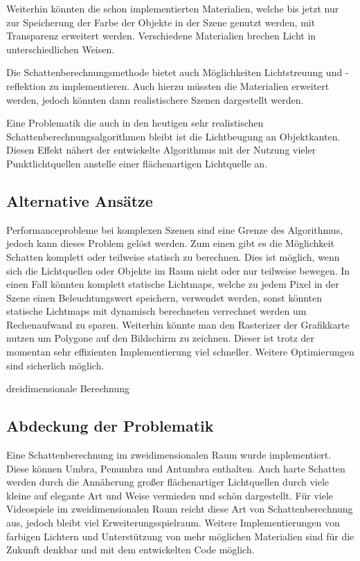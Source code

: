 Weiterhin könnten die schon implementierten Materialien, welche bis jetzt nur zur Speicherung der
Farbe der Objekte in der Szene genutzt werden, mit Transparenz erweitert werden. Verschiedene
Materialien brechen Licht in unterschiedlichen Weisen.

Die Schattenberechnungsmethode bietet auch Möglichkeiten Lichtstreuung und -reflektion zu
implementieren. Auch hierzu müssten die Materialien erweitert werden, jedoch könnten dann
realistischere Szenen dargestellt werden.

Eine Problematik die auch in den heutigen sehr realistischen Schattenberechnungsalgorithmen bleibt
ist die Lichtbeugung an Objektkanten. Diesen Effekt nähert der entwickelte Algorithmus mit der
Nutzung vieler Punktlichtquellen anstelle einer flächenartigen Lichtquelle an.

\subsection{Alternative Ansätze}

Performanceprobleme bei komplexen Szenen sind eine Grenze des Algorithmus, jedoch kann dieses Problem
gelöst werden. Zum einen gibt es die Möglichkeit Schatten komplett oder teilweise statisch zu berechnen.
Dies ist möglich, wenn sich die Lichtquellen oder Objekte im Raum nicht oder nur teilweise bewegen.
In einen Fall könnten komplett statische Lichtmaps, welche zu jedem Pixel in der Szene einen
Beleuchtungswert speichern, verwendet werden, sonst könnten statische Lichtmaps mit dynamisch berechneten
verrechnet werden um Rechenaufwand zu sparen. Weiterhin könnte man den Rasterizer der Grafikkarte nutzen
um Polygone auf den Bildschirm zu zeichnen. Dieser ist trotz der momentan sehr effizienten Implementierung
viel schneller. Weitere Optimierungen sind sicherlich möglich.

dreidimensionale Berechnung

\subsection{Abdeckung der Problematik}

Eine Schattenberechnung im zweidimensionalen Raum wurde implementiert. Diese können Umbra, Penumbra und
Antumbra enthalten. Auch harte Schatten werden durch die Annäherung großer flächenartiger Lichtquellen
durch viele kleine auf elegante Art und Weise vermieden und schön dargestellt. Für viele Videospiele im
zweidimensionalen Raum reicht diese Art von Schattenberechnung aus, jedoch bleibt viel
Erweiterungsspielraum. Weitere Implementierungen von farbigen Lichtern und Unterstützung von mehr möglichen
Materialien sind für die Zukunft denkbar und mit dem entwickelten Code möglich.
